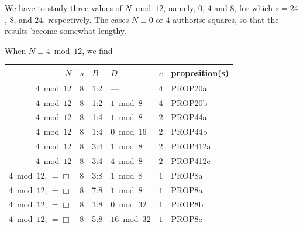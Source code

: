 \documentclass[12pt,twoside,leqno]{article}
\numberwithin{equation}{section}
\begin{document}
We have to study three values of $N\bmod 12$, namely, $0$, $4$ and $8$,
for which $s = 24$, $8$, and $24$, respectively. The cases $N \equiv 0$ or
$4$ authorise
squares, so that the results become somewhat lengthy.

When $N\equiv 4\bmod 12$, we find
\begin{center}
\begin{tabular}{|r|r||l|l||r||l|}\hline
$N$ &  $s$ & $B$          & $D$                            &
$e$ & proposition(s) \\
\hline
$4\bmod12$ & $8$ & 1:2 & --- & $4$ & PROP20a\\
$4\bmod12$ & $8$ & 1:2 & $1\bmod 8$ & $4$ & PROP20b\\
$4\bmod12$ & $8$ & 1:4 & $1\bmod 8$ & $2$ & PROP44a\\
$4\bmod12$ & $8$ & 1:4 & $0\bmod 16$ & $2$ & PROP44b\\
$4\bmod12$ & $8$ & 3:4 & $1\bmod 8$ & $2$ & PROP412a\\
$4\bmod12$ & $8$ & 3:4 & $4\bmod 8$ & $2$ & PROP412c\\
\hline
$4\bmod12$, $= \Box$ & $8$ & 3:8 & $1\bmod 8$ & $1$ & PROP8a\\
$4\bmod12$, $= \Box$ & $8$ & 7:8 & $1\bmod 8$ & $1$ & PROP8a\\
$4\bmod12$, $= \Box$ & $8$ & 1:8 & $0\bmod 32$ & $1$ & PROP8b\\
$4\bmod12$, $= \Box$ & $8$ & 5:8 & $16\bmod 32$ & $1$ & PROP8c\\
\hline
\end{tabular}
\end{center}
\end{document}
